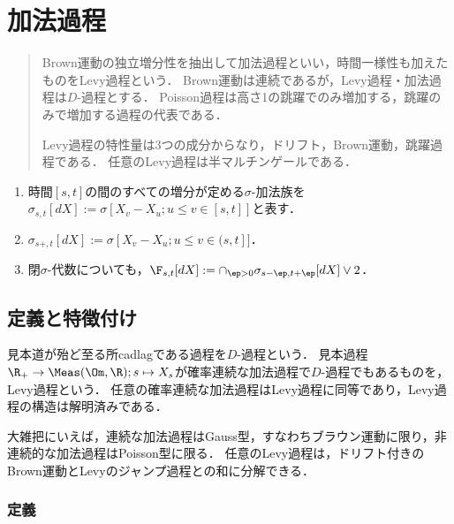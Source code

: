 \documentclass[uplatex,dvipdfmx]{jsreport}
\begin{document}
\chapter{加法過程}

\begin{quotation}
    Brown運動の独立増分性を抽出して加法過程といい，時間一様性も加えたものをLevy過程という．
    Brown運動は連続であるが，Levy過程・加法過程は$D$-過程とする．
    Poisson過程は高さ1の跳躍でのみ増加する，跳躍のみで増加する過程の代表である．

    Levy過程の特性量は3つの成分からなり，ドリフト，Brown運動，跳躍過程である．
    任意のLevy過程は半マルチンゲールである．
\end{quotation}

\begin{notation}\mbox{}
    \begin{enumerate}
        \item 時間$[s,t]$の間のすべての増分が定める$\sigma$-加法族を$\sigma_{s,t}[dX]:=\sigma[X_v-X_u;u\le v\in[s,t]]$と表す．
        \item $\sigma_{s+,t}[dX]:=\sigma[X_v-X_u;u\le v\in(s,t]]$．
        \item 閉$\sigma$-代数についても，$\F_{s,t}[dX]:=\cap_{\ep>0}\sigma_{s-\ep,t+\ep}[dX]\lor 2$．
    \end{enumerate}
\end{notation}

\section{定義と特徴付け}

\begin{tcolorbox}[colframe=ForestGreen, colback=ForestGreen!10!white,breakable,colbacktitle=ForestGreen!40!white,coltitle=black,fonttitle=\bfseries\sffamily,
    title=]
    見本道が殆ど至る所cadlagである過程を$D$-過程という．
    見本過程$\R_+\to\Meas(\Om,\R);s\mapsto X_s$が確率連続な加法過程で$D$-過程でもあるものを，Levy過程という．
    任意の確率連続な加法過程はLevy過程に同等であり，Levy過程の構造は解明済みである．

    大雑把にいえば，連続な加法過程はGauss型，すなわちブラウン運動に限り，非連続的な加法過程はPoisson型に限る．
    任意のLevy過程は，ドリフト付きのBrown運動とLevyのジャンプ過程との和に分解できる．
\end{tcolorbox}

\subsection{定義}
\end{document}
